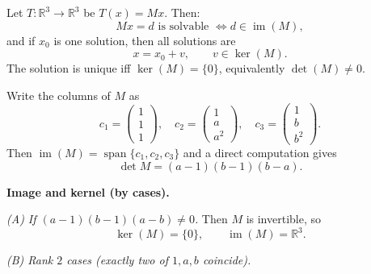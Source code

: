 \begin{solution}
Let \(T:\mathbb R^3\to\mathbb R^3\) be \(T(x)=Mx\). Then:
\[
Mx=d \text{ is solvable } \Longleftrightarrow d\in \operatorname{im}(M),
\]
and if \(x_0\) is one solution, then all solutions are
\[
x=x_0+v,\qquad v\in\ker(M).
\]
The solution is unique iff \(\ker(M)=\{0\}\), equivalently \(\det(M)\neq 0\).

Write the columns of \(M\) as
\[
c_1=\begin{pmatrix}1\\1\\1\end{pmatrix},\quad
c_2=\begin{pmatrix}1\\a\\a^2\end{pmatrix},\quad
c_3=\begin{pmatrix}1\\b\\b^2\end{pmatrix}.
\]
Then \(\operatorname{im}(M)=\operatorname{span}\{c_1,c_2,c_3\}\) and a direct computation gives
\[
\det M=(a-1)(b-1)(b-a).
\]

\textbf{Image and kernel (by cases).}

\emph{(A) If \((a-1)(b-1)(a-b)\neq 0\).}
Then \(M\) is invertible, so
\[
\ker(M)=\{0\},\qquad \operatorname{im}(M)=\mathbb R^3.
\]

\emph{(B) Rank \(2\) cases (exactly two of \(1,a,b\) coincide).}


\end{solution}
